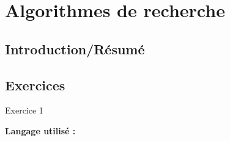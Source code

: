 \section{Algorithmes de recherche}

\subsection{Introduction/Résumé}

\subsection{Exercices}

\begin{Exercice}[Durée] Exercice 1\\

\begin{conseil}
\end{conseil}
    
\begin{solution}
\textbf{Langage utilisé :}
    
\end{solution}

\end{Exercice}



